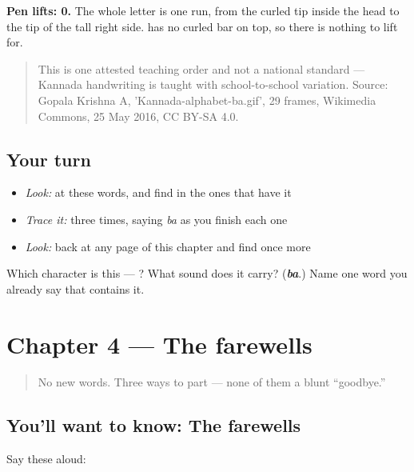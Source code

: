 \textbf{Pen lifts: 0.} The whole letter is one run, from the curled tip inside the head to the tip of the tall right side.  has no curled bar on top, so there is nothing to lift for.

\begin{quote}
This is one attested teaching order and not a national standard — Kannada handwriting is taught with school-to-school variation. Source: Gopala Krishna A, 'Kannada-alphabet-ba.gif', 29 frames, Wikimedia Commons, 25 May 2016, CC BY-SA 4.0.
\end{quote}

\subsection*{Your turn}
\begin{itemize}
\raggedright
  \item \emph{Look:} at these words, and find  in the ones that have it
\end{itemize}

\begin{quote}
\end{quote}

\begin{itemize}
\raggedright
  \item \emph{Trace it:}  three times, saying \emph{ba} as you finish each one
  \item \emph{Look:} back at any page of this chapter and find  once more
\end{itemize}

\begin{tcolorbox}[breakable,colback=teal!4,colframe=teal!35!black,title={Before you move on}]
Which character is this — ? What sound does it carry? (\emph{\textbf{ba}}.) Name one word you already say that contains it.
\end{tcolorbox}
\section[Practice]{Chapter 4 — The farewells}

\label{lesson:KA-C04-practice}



\begin{quote}
No new words. Three ways to part — none of them a blunt \textquotedblleft{}goodbye.\textquotedblright{}
\end{quote}

\subsection*{You'll want to know: The farewells}
Say these aloud:

